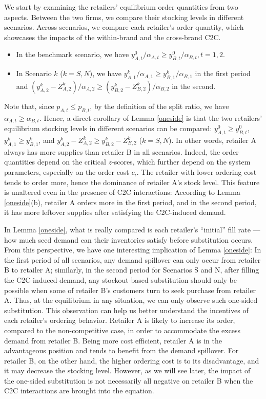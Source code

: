 \documentclass[nonblindrev,copyedit]{informs1}
\begin{document}
We start by examining the retailers' equilibrium order quantities from two aspects. Between the two firms, we compare their stocking levels in different scenarios. Across scenarios, we compare each retailer's order quantity, which showcases the impacts of the within-brand and the cross-brand C2C.
\begin{lemma}  \label{lem:oneside}
\label{oneside}
\begin{itemize}
\item[(a)] In the benchmark scenario, we have $y^0_{A,t}/\alpha_{A,t} \geq y^0_{B,t}/\alpha_{B,t}, t= 1,2$.
\item[(b)] In Scenario $k$ ($k=S, N$), we have $y^k_{A,1}/\alpha_{A,1} \geq y^k_{B,1}/\alpha_{B,1}$ in the first period and $(y^k_{A,2} - Z_{A,2}^k)/\alpha_{A,2} \geq (y^k_{B,2} - Z_{B,2}^k)/\alpha_{B,2} $ in the second.
\end{itemize}
\end{lemma}

Note that, since $p_{A,t}\leq p_{B,t}$, by the definition of the split ratio, we have $\alpha_{A,t}\geq\alpha_{B,t}$. Hence, a direct corollary of Lemma \ref{oneside} is that the two retailers' equilibrium stocking levels in different scenarios can be compared: $y^0_{A,t} \geq y^0_{B,t}$, $y^k_{A,1} \geq y^k_{B,1}$, and $y^k_{A,2} - Z_{A,2}^k \geq y^k_{B,2} - Z_{B,2}^k$ ($k=S, N$).
In other words, retailer A always has more supplies than retailer B in all scenarios. Indeed, the order quantities depend on the critical $z$-scores, which further depend on the system parameters, especially on the order cost $c_i$. The retailer with lower ordering cost tends to order more, hence the dominance of retailer A's stock level. This feature is unaltered even in the presence of C2C interactions: According to Lemma \ref{oneside}(b), retailer A orders more in the first period, and in the second period, it has more leftover supplies after satisfying the C2C-induced demand.

In Lemma \ref{oneside}, what is really compared is each retailer's ``initial'' fill rate --- how much seed demand can their inventories satisfy before substitution occurs. From this perspective, we have one interesting implication of Lemma \ref{oneside}: In the first period of all scenarios, any demand spillover can only occur from retailer B to retailer A; similarly, in the second period for Scenarios S and N, after filling the C2C-induced demand, any stockout-based substitution should only be possible when some of retailer B's customers turn to seek purchase from retailer A. Thus, at the equilibrium in any situation, we can only observe such one-sided substitution.
This observation can help us better understand the incentives of each retailer's ordering behavior. Retailer A is likely to increase its order, compared to the non-competitive case, in order to accommodate the excess demand from retailer B. Being more cost efficient, retailer A is in the advantageous position and tends to benefit from the demand spillover. For retailer B, on the other hand, the higher ordering cost is to its disadvantage, and it may decrease the stocking level. However, as we will see later, the impact of the one-sided substitution is not necessarily all negative on retailer B when the C2C interactions are brought into the equation.
\end{document}
